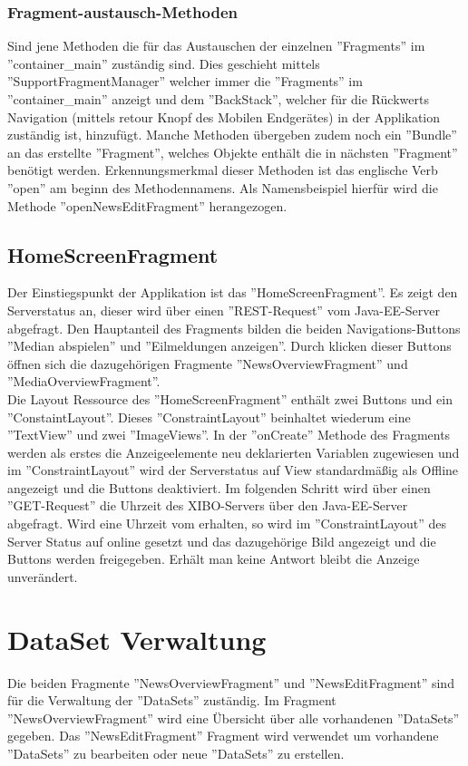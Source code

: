 \subsubsection{Fragment-austausch-Methoden}
 Sind jene Methoden die für das Austauschen der einzelnen ''Fragments'' im ''container\_main'' zuständig sind. Dies geschieht mittels ''SupportFragmentManager'' welcher immer die ''Fragments'' im ''container\_main'' anzeigt und dem ''BackStack'', welcher für die Rückwerts Navigation (mittels retour Knopf des Mobilen Endgerätes) in der Applikation zuständig ist,  hinzufügt. Manche Methoden übergeben zudem noch ein ''Bundle'' an das erstellte ''Fragment'', welches Objekte enthält die in nächsten ''Fragment'' benötigt werden. Erkennungsmerkmal dieser Methoden ist das englische Verb ''open'' am beginn des Methodennamens. Als Namensbeispiel hierfür wird die Methode ''openNewsEditFragment'' herangezogen.
\subsection{HomeScreenFragment}
Der Einstiegspunkt der Applikation ist das ''HomeScreenFragment''. Es zeigt den Serverstatus an, dieser wird über einen ''REST-Request'' vom Java-EE-Server abgefragt. Den Hauptanteil des Fragments bilden die beiden Navigations-Buttons ''Median abspielen'' und ''Eilmeldungen anzeigen''. Durch klicken dieser Buttons öffnen sich die dazugehörigen Fragmente ''NewsOverviewFragment'' und ''MediaOverviewFragment''.
\\
Die Layout Ressource des ''HomeScreenFragment'' enthält zwei Buttons und ein ''ConstaintLayout''. Dieses ''ConstraintLayout'' beinhaltet wiederum eine ''TextView'' und zwei ''ImageViews''. In der ''onCreate'' Methode des Fragments werden als erstes die Anzeigeelemente neu deklarierten Variablen zugewiesen und im ''ConstraintLayout'' wird der Serverstatus auf View standardmäßig als Offline angezeigt und die Buttons deaktiviert. Im folgenden Schritt wird über einen ''GET-Request'' die Uhrzeit des XIBO-Servers über den Java-EE-Server abgefragt. Wird eine Uhrzeit vom erhalten, so wird im ''ConstraintLayout'' des Server Status auf online gesetzt und das dazugehörige Bild angezeigt und die Buttons werden freigegeben. Erhält man keine Antwort bleibt die Anzeige unverändert.
\section{DataSet Verwaltung}
Die beiden Fragmente  ''NewsOverviewFragment'' und ''NewsEditFragment'' sind für die Verwaltung der ''DataSets'' zuständig. Im Fragment ''NewsOverviewFragment'' wird eine Übersicht über alle vorhandenen ''DataSets'' gegeben. Das ''NewsEditFragment'' Fragment wird verwendet um vorhandene ''DataSets'' zu bearbeiten oder neue ''DataSets'' zu erstellen. 
